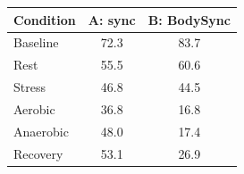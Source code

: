 \begin{tabular}{lcc}
\toprule
Condition & A: sync & B: BodySync \\
\midrule
Baseline & 72.3 & 83.7 \\
Rest & 55.5 & 60.6 \\
Stress & 46.8 & 44.5 \\
Aerobic & 36.8 & 16.8 \\
Anaerobic & 48.0 & 17.4 \\
Recovery & 53.1 & 26.9 \\
\bottomrule
\end{tabular}
